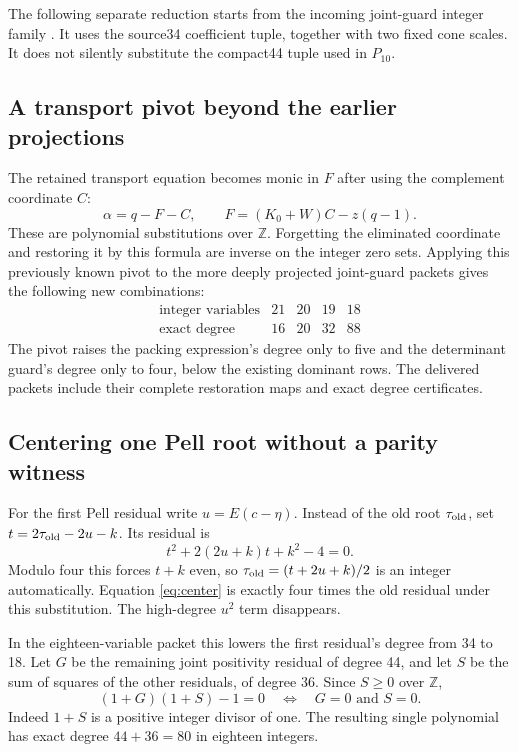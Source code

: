 \documentclass[11pt]{article}
\theoremstyle{remark}
\newcommand{\Z}{\mathbb Z}
\begin{document}
The following separate reduction starts from the incoming joint-guard
integer family \cite{joint,structural}. It uses the source34 coefficient
tuple, together with two fixed cone scales. It does not silently substitute
the compact44 tuple used in $P_{10}$.

\subsection{A transport pivot beyond the earlier projections}
The retained transport equation becomes monic in $F$ after using the
complement coordinate $C$:
\[
 \alpha=q-F-C,\qquad
 F=(K_0+W)C-z(q-1).
\]
These are polynomial substitutions over $\Z$. Forgetting the eliminated
coordinate and restoring it by this formula are inverse on the integer
zero sets. Applying this previously known pivot to the more deeply
projected joint-guard packets gives the following new combinations:
\[
\begin{array}{c|rrrr}
\text{integer variables}&21&20&19&18\\\hline
\text{exact degree}&16&20&32&88
\end{array}
\]
The pivot raises the packing expression's degree only to five and the
determinant guard's degree only to four, below the existing dominant rows.
The delivered packets include their complete restoration maps and exact
degree certificates.

\subsection{Centering one Pell root without a parity witness}
For the first Pell residual write $u=E(c-\eta)$. Instead of the old root
$\tau_{\rm old}$, set $t=2\tau_{\rm old}-2u-k$. Its residual is
\begin{equation}\label{eq:center}
 t^2+2(2u+k)t+k^2-4=0.
\end{equation}
Modulo four this forces $t+k$ even, so
$\tau_{\rm old}=(t+2u+k)/2$ is an integer automatically. Equation
\eqref{eq:center} is exactly four times the old residual under this
substitution. The high-degree $u^2$ term disappears.

In the eighteen-variable packet this lowers the first residual's degree
from 34 to 18. Let $G$ be the remaining joint positivity residual of
degree 44, and let $S$ be the sum of squares of the other residuals, of
degree 36. Since $S\ge0$ over $\Z$,
\[
 (1+G)(1+S)-1=0\quad\Longleftrightarrow\quad G=0\text{ and }S=0.
\]
Indeed $1+S$ is a positive integer divisor of one. The resulting single
polynomial has exact degree $44+36=80$ in eighteen integers.
\end{document}
